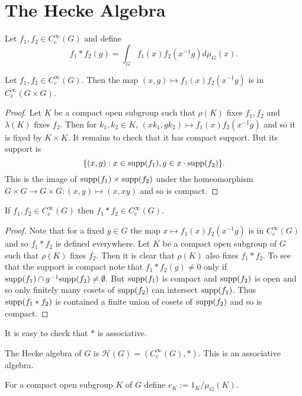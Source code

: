 \documentclass{memoir}
\begin{document}
\section{The Hecke Algebra}
\begin{definition}
    Let $f_1,f_2\in C_c^\infty(G)$ and define
    \begin{equation}
        f_1*f_2(g) = \int_Gf_1(x)f_2(x^{-1}g)d\mu_G(x).
    \end{equation}
\end{definition}
\begin{lemma}
    Let $f_1,f_2\in C_c^\infty(G)$.
    Then the map $(x,g) \mapsto f_1(x)f_2(x^{-1}g)$ is in $C_c^\infty(G\times G)$.
\end{lemma}
\begin{proof}
    Let $K$ be a compact open subgroup such that $\rho(K)$ fixes $f_1,f_2$ and $\lambda(K)$ fixes $f_2$.
    Then for $k_1,k_2\in K$, $(xk_1,gk_2)\mapsto f_1(x)f_2(x^{-1}g)$ and so it is fixed by $K\times K$.
    It remains to check that it has compact support.
    But its support is
    \begin{equation}
        \lbrace(x,g): x\in \text{supp}(f_1),g\in x\cdot \text{supp}(f_2)\rbrace.
    \end{equation}
    This is the image of $\text{supp}(f_1)\times \text{supp}(f_2)$ under the homeomorphism $G\times G\to G\times G: (x,y)\mapsto (x,xy)$ and so is compact.
\end{proof}
\begin{proposition}
    If $f_1,f_2\in C_c^\infty(G)$ then $f_1*f_2\in C_c^\infty(G)$.
\end{proposition}
\begin{proof}
    Note that for a fixed $g\in G$ the map $x\mapsto f_1(x)f_2(x^{-1}g)$ is in $C_c^\infty(G)$ and so $f_1*f_2$ is defined everywhere.
    Let $K$ be a compact open subgroup of $G$ such that $\rho(K)$ fixes $f_2.$
    Then it is clear that $\rho(K)$ also fixes $f_1*f_2$.
    To see that the support is compact note that $f_1*f_2(g) \ne 0$ only if $\text{supp}(f_1)\cap g^{-1}\text{supp}(f_2) \ne \emptyset$.
    But $\text{supp}(f_1)$ is compact and $\text{supp}(f_2)$ is open and so only finitely many cosets of $\text{supp}(f_2)$ can intersect $\text{supp}(f_1)$.
    Thus $\text{supp}(f_1*f_2)$ is contained a finite union of cosets of $\text{supp}(f_2)$ and so is compact.
\end{proof}
\begin{remark}
    It is easy to check that $*$ is associative.
\end{remark}
\begin{definition}
    The Hecke algebra of $G$ is $\mathcal H(G) = (C_c^\infty(G),*)$.
    This is an associative algebra.

    For a compact open subgroup $K$ of $G$ define $e_K := 1_K/\mu_G(K)$.
\end{definition}
\end{document}
